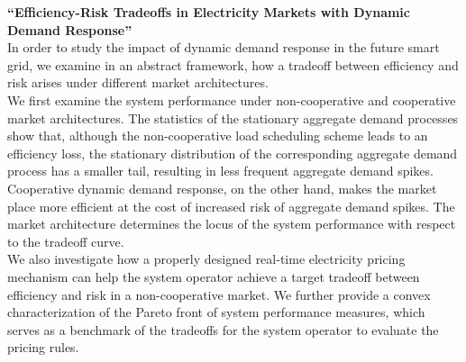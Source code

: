 \documentclass[margin,line,11pt]{resume}
\begin{document}
\begin{resume}
\textbf{``Efficiency-Risk Tradeoffs in Electricity Markets with Dynamic Demand Response''}
\\
In order to study the impact of dynamic demand response in the future smart grid, we examine in an
abstract framework, how a tradeoff between efficiency and risk arises under different market
architectures.
\\
We first examine the system performance under non-cooperative and cooperative market architectures.
%
The statistics of the stationary aggregate demand processes show that, although the non-cooperative
load scheduling scheme leads to an efficiency loss, the stationary distribution of the corresponding
aggregate demand process has a smaller tail, resulting in less frequent aggregate demand spikes.
%
{Cooperative dynamic demand response, on the other hand, makes the market place more efficient at
  the cost of increased risk of aggregate demand spikes. The market architecture determines the
  locus of the system performance with respect to the tradeoff curve.}
\\
We also investigate how a properly designed real-time electricity pricing mechanism can help the
system operator achieve a target tradeoff between efficiency and risk in a non-cooperative market.
%
We further provide a convex characterization of the Pareto front of system performance measures,
which serves as a benchmark of the tradeoffs for the system operator to evaluate the pricing rules.



\end{resume}
\end{document}

